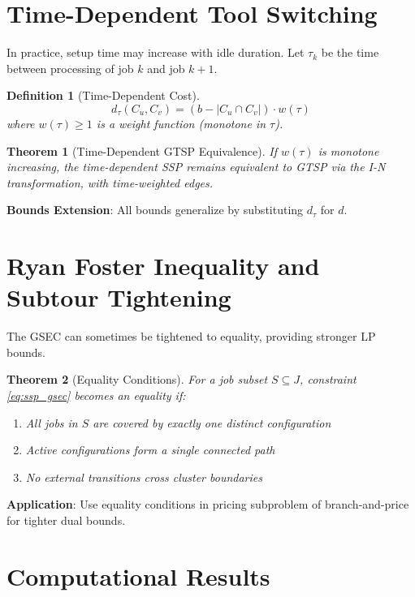 \documentclass[12pt]{article}
\newtheorem{theorem}{Theorem}[section]
\newtheorem{definition}{Definition}[section]
\begin{document}
	\section{Time-Dependent Tool Switching}
	
	In practice, setup time may increase with idle duration. Let $\tau_k$ be the time between processing of job $k$ and job $k+1$.
	
	\begin{definition}[Time-Dependent Cost]
		$$d_{\tau}(C_u, C_v) = (b - |C_u \cap C_v|) \cdot w(\tau)$$
		where $w(\tau) \ge 1$ is a weight function (monotone in $\tau$).
	\end{definition}
	
	\begin{theorem}[Time-Dependent GTSP Equivalence]
		If $w(\tau)$ is monotone increasing, the time-dependent SSP remains equivalent to GTSP via the I-N transformation, with time-weighted edges.
	\end{theorem}
	
	\textbf{Bounds Extension}: All bounds generalize by substituting $d_\tau$ for $d$.
	
	\section{Ryan Foster Inequality and Subtour Tightening}
	
	The GSEC can sometimes be tightened to equality, providing stronger LP bounds.
	
	\begin{theorem}[Equality Conditions]
		For a job subset $S \subseteq J$, constraint \eqref{eq:ssp_gsec} becomes an equality if:
		\begin{enumerate}
			\item All jobs in $S$ are covered by exactly one distinct configuration
			\item Active configurations form a single connected path
			\item No external transitions cross cluster boundaries
		\end{enumerate}
	\end{theorem}
	
	\textbf{Application}: Use equality conditions in pricing subproblem of branch-and-price for tighter dual bounds.
	
	\section{Computational Results}
	
\end{document}
